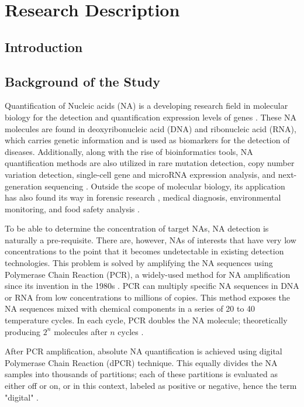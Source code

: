 \chapter{Research Description}
\label{sec:researchdesc} 

\section{Introduction}
\label{sec:introduction}

\section{Background of the Study}
\label{sec:backgroundstudy}

Quantification of Nucleic acids (NA) is a developing research field in molecular biology for the detection and quantification expression levels of genes \cite{Huggett2015}. These NA molecules are found in deoxyribonucleic acid (DNA) and ribonucleic acid (RNA), which carries genetic information and is used as biomarkers for the detection of diseases. Additionally, along with the rise of bioinformatics tools, NA quantification methods are also utilized in rare mutation detection, copy number variation detection, single-cell gene and microRNA expression analysis, and next-generation sequencing \cite{Quan2018}. Outside the scope of molecular biology, its application has also found its way in forensic research \cite{Whale2013}, medical diagnosis, environmental monitoring, and food safety analysis \cite{Cao2017}.


To be able to determine the concentration of target NAs, NA detection is naturally a pre-requisite. There are, however, NAs of interests that have very low concentrations to the point that it becomes undetectable in existing detection technologies. This problem is solved by amplifying the NA sequences using Polymerase Chain Reaction (PCR), a widely-used method for NA amplification since its invention in the 1980s \cite{Cao2017}. PCR can multiply specific NA sequences in DNA or RNA from low concentrations to millions of copies. This method exposes the NA sequences mixed with chemical components in a series of 20 to 40 temperature cycles. In each cycle, PCR doubles the NA molecule; theoretically producing \(2^n\) molecules after \(n\) cycles \cite{Quan2018}.

After PCR amplification, absolute NA quantification is achieved using digital Polymerase Chain Reaction (dPCR) technique. This equally divides the NA samples into thousands of partitions; each of these partitions is evaluated as either off or on, or in this context, labeled as positive or negative, hence the term "digital" \cite{Cao2017}.

